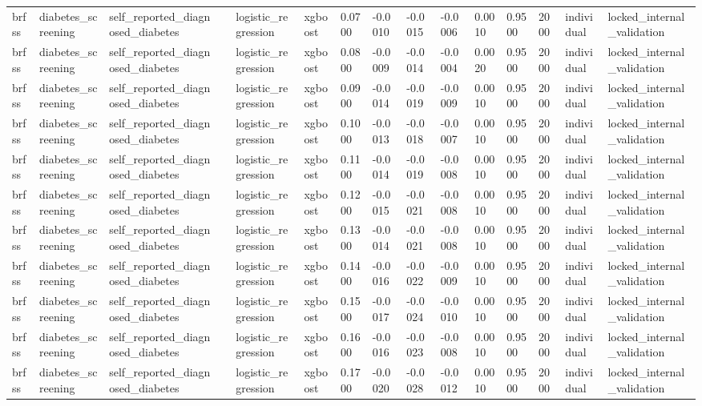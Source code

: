 \begin{tabular}{lllllllllllllll}
brfss & diabetes\_screening & self\_reported\_diagnosed\_diabetes &  & logistic\_regression & xgboost & 0.0700 & -0.0010 & -0.0015 & -0.0006 & 0.0010 & 0.9500 & 2000 & individual & locked\_internal\_validation \\
brfss & diabetes\_screening & self\_reported\_diagnosed\_diabetes &  & logistic\_regression & xgboost & 0.0800 & -0.0009 & -0.0014 & -0.0004 & 0.0020 & 0.9500 & 2000 & individual & locked\_internal\_validation \\
brfss & diabetes\_screening & self\_reported\_diagnosed\_diabetes &  & logistic\_regression & xgboost & 0.0900 & -0.0014 & -0.0019 & -0.0009 & 0.0010 & 0.9500 & 2000 & individual & locked\_internal\_validation \\
brfss & diabetes\_screening & self\_reported\_diagnosed\_diabetes &  & logistic\_regression & xgboost & 0.1000 & -0.0013 & -0.0018 & -0.0007 & 0.0010 & 0.9500 & 2000 & individual & locked\_internal\_validation \\
brfss & diabetes\_screening & self\_reported\_diagnosed\_diabetes &  & logistic\_regression & xgboost & 0.1100 & -0.0014 & -0.0019 & -0.0008 & 0.0010 & 0.9500 & 2000 & individual & locked\_internal\_validation \\
brfss & diabetes\_screening & self\_reported\_diagnosed\_diabetes &  & logistic\_regression & xgboost & 0.1200 & -0.0015 & -0.0021 & -0.0008 & 0.0010 & 0.9500 & 2000 & individual & locked\_internal\_validation \\
brfss & diabetes\_screening & self\_reported\_diagnosed\_diabetes &  & logistic\_regression & xgboost & 0.1300 & -0.0014 & -0.0021 & -0.0008 & 0.0010 & 0.9500 & 2000 & individual & locked\_internal\_validation \\
brfss & diabetes\_screening & self\_reported\_diagnosed\_diabetes &  & logistic\_regression & xgboost & 0.1400 & -0.0016 & -0.0022 & -0.0009 & 0.0010 & 0.9500 & 2000 & individual & locked\_internal\_validation \\
brfss & diabetes\_screening & self\_reported\_diagnosed\_diabetes &  & logistic\_regression & xgboost & 0.1500 & -0.0017 & -0.0024 & -0.0010 & 0.0010 & 0.9500 & 2000 & individual & locked\_internal\_validation \\
brfss & diabetes\_screening & self\_reported\_diagnosed\_diabetes &  & logistic\_regression & xgboost & 0.1600 & -0.0016 & -0.0023 & -0.0008 & 0.0010 & 0.9500 & 2000 & individual & locked\_internal\_validation \\
brfss & diabetes\_screening & self\_reported\_diagnosed\_diabetes &  & logistic\_regression & xgboost & 0.1700 & -0.0020 & -0.0028 & -0.0012 & 0.0010 & 0.9500 & 2000 & individual & locked\_internal\_validation \\

\end{tabular}
